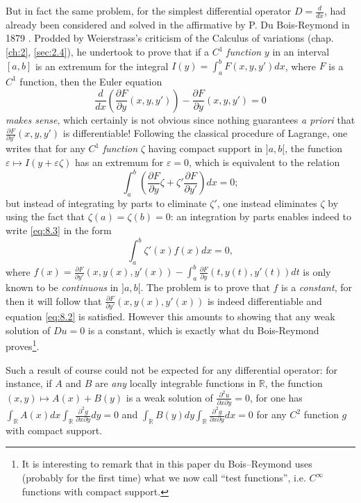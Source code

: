 \documentclass[12pt,a4paper,leqno,twoside]{extbook}
\newcommand{\R}{\mathbb{R}}
\newcommand{\pder}[2]{\frac{\partial #1}{\partial #2}}
\begin{document}
But in fact the same problem, for the simplest differential operator \(D = \frac{d}{dx}\), had already been considered and solved in the affirmative by P. Du Bois-Reymond in 1879 \cite{060}. Prodded by Weierstrass's criticism of the Calculus of variations (chap. \ref{ch:2}, \ref{sec:2.4}), he undertook to prove that if a \(C^1\) \emph{function} \(y\) in an interval \([a,b]\) is an extremum for the integral \(I(y) = \int_a^b F(x,y,y')dx\), where \(F\) is a \(C^1\) function, then the Euler equation
\begin{equation}
    \label{eq:8.2}
    \frac{d}{dx}\left( \pder{F}{y}(x,y,y') \right) - \pder{F}{y}(x,y,y') = 0
\end{equation}
\emph{makes sense}, which certainly is not obvious since nothing guarantees \emph{a priori} that \(\pder{F}{y'}(x, y, y')\) is differentiable! Following the classical procedure of Lagrange, one writes that for any \(C^1\) \emph{function} \(\zeta\) having compact support in \(]a,b[\), the function \(\varepsilon \mapsto I(y + \varepsilon \zeta)\) has an extremum for \(\varepsilon = 0\), which is equivalent to the relation
\begin{equation}
    \label{eq:8.3}
    \int_a^b \left( \pder{F}{y} \zeta + \zeta' \pder{F}{y'} \right) dx = 0;
\end{equation}
but instead of integrating by parts to eliminate \(\zeta'\), one instead eliminates \(\zeta\) by using the fact that \(\zeta(a) = \zeta(b) = 0\): an integration by parts enables indeed to write \eqref{eq:8.3} in the form
\begin{equation}
    \label{eq:8.4}
    \int_a^b \zeta'(x)f(x)dx = 0,
\end{equation}
where \(f(x) = \pder{F}{y'}(x,y(x),y'(x)) - \int_a^b \pder{F}{y}(t,y(t),y'(t))dt\) is only known to be \emph{continuous} in \(]a,b[\). The problem is to prove that \(f\) is a \emph{constant}, for then it will follow that \(\pder{F}{y'}(x,y(x),y'(x)) \) is indeed differentiable and equation \eqref{eq:8.2} is satisfied. However this amounts to showing that any weak solution of \(Du = 0\) is a constant, which is exactly what du Bois-Reymond proves\footnote{It is interesting to remark that in this paper du Bois--Reymond uses (probably for the first time) what we now call ``test functions'', i.e. \(C^\infty\) functions with compact support.}.

Such a result of course could not be expected for any differential operator: for instance, if \(A\) and \(B\) are \emph{any} locally integrable functions in \(\R\), the function \((x,y) \mapsto A(x) + B(y)\) is a weak solution of \(\frac{\partial^2 u}{\partial x \partial y} = 0\), for one has \(\int_{\R} A(x)dx \int_{\R} \frac{\partial^2 g}{\partial x \partial y} dy = 0\) and \(\int_{\R} B(y)dy \int_{\R} \frac{\partial^2 g}{\partial x \partial y} dx = 0\) for any \(C^2\) function \(g\) with compact support.
\end{document}
